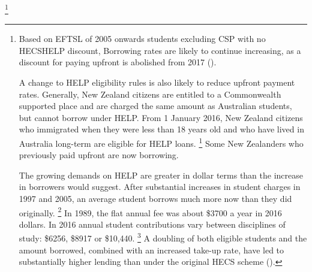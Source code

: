 \documentclass[embargoed]{grattan}
\begin{document}
\footnote{Based on \gls{EFTSL} of 2005 onwards students excluding CSP with no \gls{HECSHELP} discount, \textcite{ Department of Education and Training (various years-d), section 5: liability status categories} Borrowing rates are likely to continue increasing, as a discount for paying upfront is abolished from 2017 ().

A change to \gls{HELP} eligibility rules is also likely to reduce upfront payment rates.
Generally, New Zealand citizens are entitled to a Commonwealth supported place and are charged the same amount as Australian students, but cannot borrow under \gls{HELP}.
From 1 January 2016, New Zealand citizens who immigrated when they were less than 18 years old and who have lived in Australia long-term are eligible for \gls{HELP} loans.%
\footnote{Department of Education and Training (2016c)} Some New Zealanders who previously paid upfront are now borrowing.

The growing demands on \gls{HELP} are greater in dollar terms than the increase in borrowers would suggest.
After substantial increases in student charges in 1997 and 2005, an average student borrows much more now than they did originally.%
\footnote{Student contributions are indexed to the Higher Education Grant Index (HEGI); a combination of \gls{CPI} and the wage price index.
From 2018, \gls{CPI} will replace HEGI as a result of the Budget Savings (Omnibus) Bill 2016.} In 1989, the flat annual fee was about \$3700 a year in 2016 dollars.
In 2016 annual student contributions vary between disciplines of study: \$6256, \$8917 or \$10,440.%
\footnote{The 1989 student contribution was indexed to 2016 dollars using \gls{CPI}, \textcites{ABS2016LabourforceAustralia}[][1--8]{Government2016Budget201617}{Education2015DepartmentEducationTraining}} %
A doubling of both eligible students and the amount borrowed, combined with an increased take-up rate, have led to substantially higher lending than under the original \gls{HECS} scheme ().

}
\end{document}
